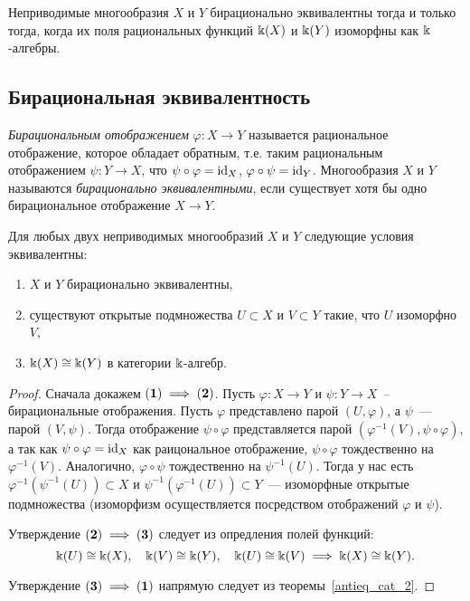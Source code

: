     \begin{corollary}
         Неприводимые многообразия $X$ и $Y$ бирационально эквивалентны тогда и только тогда, когда их поля рациональных функций $\bk(X)$ и $\bk(Y)$  изоморфны как $\bk$-алгебры. 
     \end{corollary}

	 \subsection{Бирациональная эквивалентность}

	 \begin{definition} 
	 	\emph{Бирациональным отображением } $\varphi\colon X \to Y$ называется рациональное отображение, которое обладает обратным, т.е. таким рациональным отображением $\psi\colon Y \to X$, что $\psi \circ \varphi = \id_{X}$, $\varphi \circ \psi = \id_{Y}$. Многообразия $X$ и $Y$ называются \emph{бирационально эквивалентными}, если существует хотя бы одно бирациональное отображение $X \to Y$. 
	 \end{definition}

	 \begin{corollary}
	 	Для любых двух неприводимых многообразий $X$ и $Y$ следующие условия эквивалентны: 

	 	\begin{enumerate}
	 		\item $X$ и $Y$ бирационально эквивалентны, 
	 		\item существуют открытые подмножества $U \subset X$ и $V \subset Y$ такие, что $U$ изоморфно $V$,
	 		\item $\bk(X) \cong \bk(Y)$ в категории $\bk$-алгебр. 
	 	\end{enumerate}
	 \end{corollary}
	 \begin{proof}
	 	Сначала докажем $(\bf{1}) \implies (\bf{2})$. Пусть $\varphi \colon X \to Y$ и $\psi \colon Y \to X$~-- бирациональные отображения. Пусть $\varphi$ представлено парой $(U, \varphi)$, а $\psi$~--- парой $(V, \psi)$. Тогда отображение $\psi \circ \varphi$ представляется парой $(\varphi^{-1}(V), \psi \circ \varphi)$, а так как $\psi \circ \varphi = \id_{X}$ как раицональное отображение, $\psi \circ \varphi$ тождественно на $\varphi^{-1}(V)$. Аналогично, $\varphi \circ \psi$ тождественно на $\psi^{-1}(U)$. Тогда у нас есть $\varphi^{-1}(\psi^{-1}(U)) \subset X$ и $\psi^{-1}(\varphi^{-1}(U)) \subset Y$~--- изоморфные открытые подмножества (изоморфизм осуществляется посредством отображений $\varphi$ и $\psi$). 

	 	Утверждение $(\bf{2}) \implies (\bf{3})$ следует из опредления полей функций:
	 	\[
	 		\bk(U) \cong \bk(X), \quad \bk(V) \cong \bk(Y), \quad \bk(U) \cong \bk(V) \implies \bk(X) \cong \bk(Y).
	 	\]

	 	Утверждение $(\bf{3}) \implies (\bf{1})$ напрямую следует из теоремы~\ref{antieq_cat_2}.
	 \end{proof}

